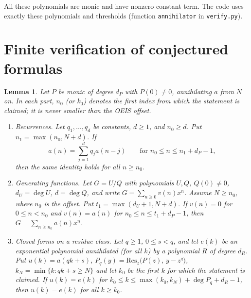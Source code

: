\documentclass[11pt]{article}
\newtheorem{lemma}[theorem]{Lemma}
\theoremstyle{definition}
\theoremstyle{remark}
\begin{document}
All these polynomials are monic and have nonzero constant term. The code uses exactly these polynomials and thresholds (function \texttt{annihilator} in \texttt{verify.py}).

\section{Finite verification of conjectured formulas}

\begin{lemma}\label{lem:fin}
Let $P$ be monic of degree $d_P$ with $P(0)\ne0$, annihilating $a$ from $N$ on. In each part, $n_0$ (or $k_0$) denotes the first index from which the statement is claimed; it is never smaller than the OEIS offset.
\begin{enumerate}
\item[(a)] \emph{Recurrences.} Let $q_1,\dots,q_d$ be constants, $d\ge1$, and $n_0\ge d$. Put $n_1=\max(n_0,N+d)$. If
\[ a(n)=\textstyle\sum_{j=1}^{d}q_ja(n-j)\qquad\text{for } n_0\le n\le n_1+d_P-1, \]
then the same identity holds for all $n\ge n_0$.
\item[(b)] \emph{Generating functions.} Let $G=U/Q$ with polynomials $U,Q$, $Q(0)\ne0$, $d_U=\deg U$, $d=\deg Q$, and write $G=\sum_{n\ge0}v(n)x^n$. Assume $N\ge n_0$, where $n_0$ is the offset. Put $t_1=\max(d_U+1,N+d)$. If $v(n)=0$ for $0\le n<n_0$ and $v(n)=a(n)$ for $n_0\le n\le t_1+d_P-1$, then $G=\sum_{n\ge n_0}a(n)x^n$.
\item[(c)] \emph{Closed forms on a residue class.} Let $q\ge1$, $0\le s<q$, and let $e(k)$ be an exponential polynomial annihilated (for all $k$) by a polynomial $R$ of degree $d_R$. Put $u(k)=a(qk+s)$, $P_q(y)=\mathrm{Res}_z\bigl(P(z),\,y-z^q\bigr)$, $k_N=\min\{k:qk+s\ge N\}$ and let $k_0$ be the first $k$ for which the statement is claimed. If $u(k)=e(k)$ for $k_0\le k\le \max(k_0,k_N)+\deg P_q+d_R-1$, then $u(k)=e(k)$ for all $k\ge k_0$.
\end{enumerate}
\end{lemma}
\end{document}
